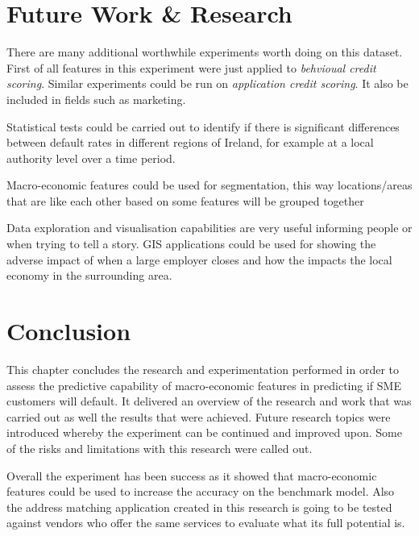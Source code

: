 \section{Future Work \& Research}

There are many additional worthwhile experiments worth doing on this dataset. First of all features in this experiment were just applied to \textit{behvioual credit scoring}. Similar experiments could be run on \textit{application credit scoring}. It also be included in fields such as marketing.

Statistical tests could be carried out to identify if there is significant differences between default rates in different regions of Ireland, for example at a local authority level over a time period. 

Macro-economic features could be used for segmentation, this way locations/areas that are like each other based on some features will be grouped together

Data exploration and visualisation capabilities are very useful informing people or when trying to tell a story. GIS applications could be used for showing the adverse impact of when a large employer closes and how the impacts the local economy in the surrounding area.
\section{Conclusion}
This chapter concludes the research and experimentation performed in order to assess the predictive capability of macro-economic features in predicting if SME customers will default. It delivered an overview of the research and work that was carried out as well the results that were achieved. Future research topics were introduced whereby the experiment can be continued and improved upon. Some of the risks and limitations with this research were called out.

Overall the experiment has been success as it showed that macro-economic features could be used to increase the accuracy on the benchmark model. Also the address matching application created in this research is going to be tested against vendors who offer the same services to evaluate what its full potential is.










